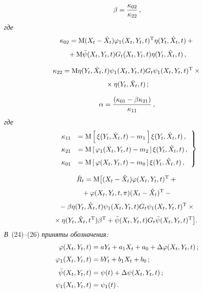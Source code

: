\begin{multicols}{2}
\vspace*{3pt}

\noindent
\begin{equation*}
\beta=\displaystyle\frac{\displaystyle \kappa_{02}\mathstrut}{\displaystyle \kappa_{22}\mathstrut}\,,
\end{equation*}
\textit{где}
    \begin{multline*}
    \kappa_{02} ={\rm M} (X_t -\hat X_t) \varphi_1 (X_t, Y_t, t)^{\mathrm{T}} \eta (Y_t, \hat X_t, t)+{}\\[3pt]
    {}+
    {\rm M} \bar \psi (X_t, Y_t, t) G_t (X_t, Y_t, t)\eta (Y_t, \hat X_t, t)\,,
    \end{multline*}
    
    \vspace*{-6pt}
    
    \noindent
\begin{multline}
\kappa_{22} ={\rm M} \eta (Y_t, \hat X_t, t) \psi_1(X_t, Y_t, t) G_t \psi_1(X_t, Y_t, t)^{\mathrm{T}} \times{}\\[3pt]
{}\times \eta (Y_t, \hat X_t, t)\,;
\label{e38sin}
\end{multline}

\vspace*{-6pt}

    \noindent
    \begin{equation*}
    \alpha =\displaystyle\frac{\displaystyle (\kappa_{01} -\beta \kappa_{21})\mathstrut}{\displaystyle \kappa_{11}\mathstrut}\,,
    \end{equation*}
\textit{где}
\begin{equation}
\left.
\begin{array}{rl}
\kappa_{11}&= {\rm M} \left[\, \xi (Y_t, \hat X_t, t) -m_1\,\right] \xi (Y_t, \hat X_t, t)\,,\\[6pt]
\kappa_{21} &={\rm M} \left[\, \varphi_1 (X_t, Y_t, t)-m_2\,\right] \xi (Y_t, \hat X_t, t)\,,\\[6pt]
\kappa_{01} &={\rm M} \left[\, \varphi (X_t, Y_t, t) -m_0\,\right]  \xi (Y_t, \hat X_t, t)\,,
\end{array}
\right \}
\label{e40sin}
\end{equation}

\noindent
\begin{multline*}
\dot R_t ={\rm M} \big[ (X_t -\hat X_t)\varphi (X_t, Y_t, t)^{\mathrm{T}} +{}\\[3pt]
{}+\varphi (X_t, Y_t, t,\pi) (X_t -\hat X_t)^{\mathrm{T}}-{}\\[3pt]
{}-\beta\eta (Y_t,\hat X_t, t) \psi_1 (X_t, Y_t, t) G_t \psi_1 (X_t, Y_t, t)^{\mathrm{T}} \times{}\\[3pt]
\!\!\!{}\times \eta (Y_t,\hat X_t,  t^{\mathrm{T}})\beta^{\mathrm{T}}
+\bar\psi (X_t, Y_t, t)G_t \bar \psi (X_t, Y_t, t)^{\mathrm{T}}\big ].
\end{multline*}
\textit{В}~(24)--(26) \textit{приняты обозначения:}
\begin{align*}
\varphi (X_t, Y_t, t) &= a Y_t + a_1 X_t + a_0 + \Delta\varphi (X_t, Y_t, t)\,;\\[3pt]
\varphi_1 (X_t, Y_t, t)&= bY_t + b_1 X_t + b_0\,;\\[3pt]
\bar\psi (X_t, Y_t, t)&=\psi(t) +\Delta \psi (X_t, Y_t, t)\,;\\[3pt]
\psi_1 (X_t, Y_t, t)&=\psi_1(t)\,.
\end{align*}


\end{multicols}
